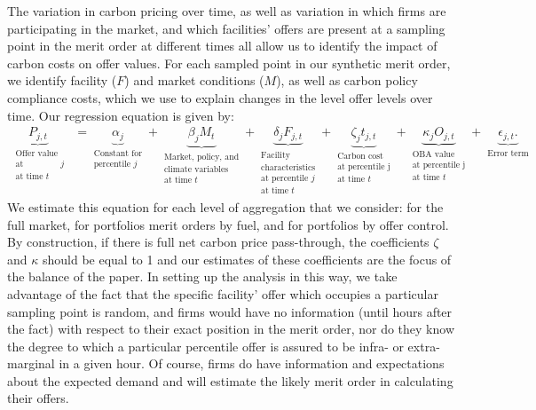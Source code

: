 \documentclass[12pt]{article}
\begin{document}
The variation in carbon pricing over time, as well as variation in which firms are participating in  the market, and which facilities' offers are present at a sampling point in the merit order at different times all allow us to identify the impact of carbon costs on offer values. For each sampled point in our synthetic merit order, we identify facility ($F$) and market conditions ($M$), as well as carbon policy compliance costs, which we use to explain changes in the level offer levels over time. Our regression equation is given by:
\begin{align}\label{eq:regression}
 \underbrace{P_{j,t}}_{\substack{\text{Offer value} \\ \text{at percentile }j\\ \text{at time }t}}&=
 \underbrace{\alpha_{j}}_{\substack{\text{Constant for} \\ \text{percentile }j}}+
 \underbrace{\beta_j M_t}_{\substack{\text{Market, policy, and} \\ \text{climate variables} \\\text{at time }t}}+
 \underbrace{\delta_j F_{j,t}}_{\substack{\text{Facility} \\ \text{characteristics} \\ \text{at percentile }j\\ \text{at time }t}}+
 \underbrace{\zeta_j t_{j,t}}_{\substack{\text{Carbon cost} \\ \text{at percentile j}\\ \text{at time }t}}+
 \underbrace{\kappa_j O_{j,t}}_{\substack{\text{OBA value} \\ \text{at percentile j}\\ \text{at time }t}}+
 \underbrace{\epsilon_{j,t}.}_{\substack{\text{Error term}}}
\end{align}
\noindent We estimate this equation for each level of aggregation that we consider: for the full market, for portfolios merit orders by fuel, and for portfolios by offer control. By construction, if there is full net carbon price pass-through, the coefficients $\zeta$ and $\kappa$ should be equal to 1 and our estimates of these coefficients are the focus of the balance of the paper. In setting up the analysis in this way, we take advantage of the fact that the specific facility' offer which occupies a particular sampling point is random, and firms would have no information (until hours after the fact) with respect to their exact position in the merit order, nor do they know the degree to which a particular percentile offer is assured to be infra- or extra-marginal in a given hour. Of course, firms do have information and expectations about the expected demand and will estimate the likely merit order in calculating their offers. 
\end{document}
